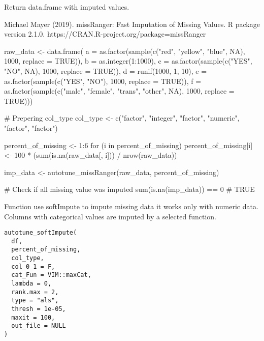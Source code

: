 \documentclass[letterpaper]{book}
\begin{document}
%
\begin{Value}
Return data.frame with imputed values.
\end{Value}
%
\begin{References}\relax
Michael Mayer (2019). missRanger: Fast Imputation of Missing Values. R package version 2.1.0. https://CRAN.R-project.org/package=missRanger
\end{References}
%
\begin{Examples}
\begin{ExampleCode}
{
  raw_data <- data.frame(
    a = as.factor(sample(c("red", "yellow", "blue", NA), 1000, replace = TRUE)),
    b = as.integer(1:1000),
    c = as.factor(sample(c("YES", "NO", NA), 1000, replace = TRUE)),
    d = runif(1000, 1, 10),
    e = as.factor(sample(c("YES", "NO"), 1000, replace = TRUE)),
    f = as.factor(sample(c("male", "female", "trans", "other", NA), 1000, replace = TRUE)))

  # Prepering col_type
  col_type <- c("factor", "integer", "factor", "numeric", "factor", "factor")

  percent_of_missing <- 1:6
  for (i in percent_of_missing) {
    percent_of_missing[i] <- 100 * (sum(is.na(raw_data[, i])) / nrow(raw_data))
  }


  imp_data <- autotune_missRanger(raw_data, percent_of_missing)

  # Check if all missing value was imputed
  sum(is.na(imp_data)) == 0
  # TRUE
}
\end{ExampleCode}
\end{Examples}
%
\begin{Description}\relax
Function use softImpute to impute missing data it works only with numeric data. Columns with categorical values are imputed by a selected function.
\end{Description}
%
\begin{Usage}
\begin{verbatim}
autotune_softImpute(
  df,
  percent_of_missing,
  col_type,
  col_0_1 = F,
  cat_Fun = VIM::maxCat,
  lambda = 0,
  rank.max = 2,
  type = "als",
  thresh = 1e-05,
  maxit = 100,
  out_file = NULL
)
\end{verbatim}
\end{Usage}
%
\end{document}
